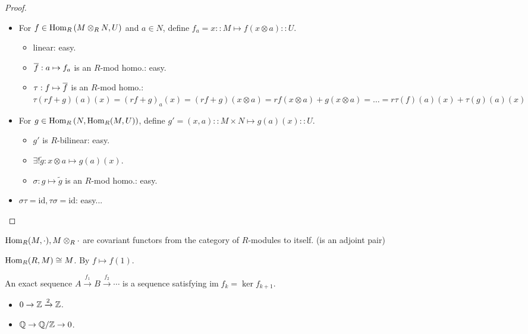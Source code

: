 \begin{proof} \mbox{}
  \begin{itemize}
    \item For $f \in \operatorname{Hom}_R\left(M \otimes_R N, U\right)$ and $a \in N$,
      define $f_a = x :: M \mapsto f(x \otimes a) :: U$.
      \begin{itemize}
        \item linear: easy.
        \item $\overline{f}: a \mapsto f_a$ is an $R$-mod homo.: easy.
        \item $\tau: f \mapsto \overline{f}$ is an $R$-mod homo.:
          $\tau(rf+g)(a)(x) = (rf+g)_a(x) = (rf+g)(x\otimes a)
          = rf(x\otimes a) + g(x\otimes a) = \dots
          = r\tau(f)(a)(x) + \tau(g)(a)(x)$
      \end{itemize}
    \item For $g \in \operatorname{Hom}_R\left(N, \operatorname{Hom}_R(M, U)\right)$,
      define $g' = (x, a) :: M \times N \mapsto g(a)(x) :: U$.
      \begin{itemize}
        \item $g'$ is $R$-bilinear: easy.
        \item $\exists! \tilde{g}: x\otimes a \mapsto g(a)(x)$.
        \item $\sigma: g\mapsto \tilde{g}$ is an $R$-mod homo.: easy.
      \end{itemize}
    \item $\sigma \tau = \text{id}, \tau \sigma = \text{id}$: easy...
      \qedhere
  \end{itemize}
\end{proof}

\begin{exercise}
  $\operatorname{Hom}_R(M, \cdot), M \otimes_R \cdot$ are covariant functors from the
  category of $R$-modules to itself.
  (is an adjoint pair)
\end{exercise}

\begin{fact}
  $\operatorname{Hom}_R(R, M) \cong M$. By $f \mapsto f(1)$.
\end{fact}

\begin{definition}
  An exact sequence $A \xrightarrow{f_1} B \xrightarrow{f_2} \cdots$ is
  a sequence satisfying $\text{im}\; f_k = \ker f_{k+1}$.
\end{definition}

\begin{itemize}
  \item $0 \to \mathbb{Z} \xrightarrow{2} \mathbb{Z}$.
  \item $\mathbb{Q} \to {\mathbb{Q}}/{\mathbb{Z}} \to 0$.
\end{itemize}

